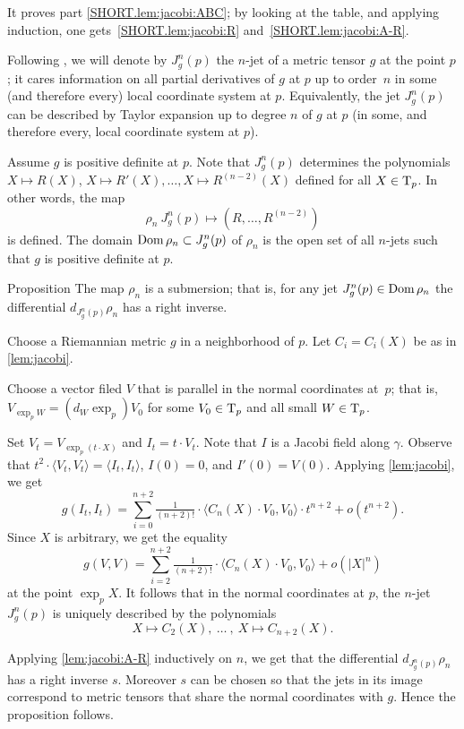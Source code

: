 \documentclass[a4paper,10pt]{article}
\begin{document}
It proves part \ref{SHORT.lem:jacobi:ABC};
by looking at the table, and applying induction, one gets~\ref{SHORT.lem:jacobi:R} and~\ref{SHORT.lem:jacobi:A-R}.\qeds

Following \cite{eliashberg-mishachev}, we will denote by $J^n_g(p)$ the $n$-jet of a metric tensor $g$ at the point $p$;
it cares information on all partial derivatives of $g$ at $p$ up to order~$n$ in some (and therefore every) local coordinate system at $p$.
Equivalently, the jet $J^n_g(p)$ can be described by Taylor expansion up to degree $n$ of $g$ at $p$ (in some, and therefore every, local coordinate system at $p$).

Assume $g$ is positive definite at $p$.
Note that $J^n_g(p)$ determines the polynomials 
$X\mapsto R(X)$, $X\mapsto R'(X),\dots, X\mapsto R^{(n-2)}(X)$ defined for all $X\in \mathrm{T}_p$. 
In other words, the map 
\[\rho_n\:J^n_g(p)\mapsto (R,\dots,R^{(n-2)})\]
is defined.
The domain $\mathop{\rm Dom}\nolimits \rho_n\subset J^n_g(p)$ of $\rho_n$ is the open set of all $n$-jets such that $g$ is positive definite at $p$.

\begin{thm}{Proposition}\label{prop:submersion}
The map $\rho_n$ is a submersion;
that is, for any jet $J^n_g(p)\z\in \Dom \rho_n$ the differential $d_{J^n_g(p)}\rho_n$ has a right inverse.
\end{thm}

Choose a Riemannian metric $g$ in a neighborhood of $p$.
Let $C_i=C_i(X)$ be as in \ref{lem:jacobi}.

Choose a vector filed $V$ that is parallel in the normal coordinates at~$p$;
that is, $V_{\exp_pW}=(d_W\exp_p)V_0$ for some $V_0\in\mathrm{T}_p$ and all small $W\in \mathrm{T}_p$.

Set $V_t=V_{\exp_p(t\cdot X)}$ and $I_t=t\cdot V_t$.
Note that $I$ is a Jacobi field along $\gamma$.
Observe that $t^2\cdot \langle V_t, V_t\rangle=\langle I_t, I_t\rangle$, $I(0)=0$, and $I'(0)=V(0)$.
Applying \ref{lem:jacobi}, we get
\[g(I_t, I_t)=\sum_{i=0}^{n+2}\tfrac1{(n+2)!}\cdot\langle C_n(X)\cdot V_0,V_0\rangle\cdot t^{n+2}+o(t^{n+2}).\]
Since $X$ is arbitrary, we get the equality
\[g( V, V)=\sum_{i=2}^{n+2}\tfrac1{(n+2)!}\cdot\langle C_n(X)\cdot V_0,V_0\rangle+o(|X|^{n})\]
at the point $\exp_p X$.
It follows that in the normal coordinates at $p$,
the $n$-jet $J^n_g(p)$ is uniquely described by the polynomials
\[X\mapsto C_2(X),
\ \dots\ ,\  
X\mapsto C_{n+2}(X).\]

Applying \ref{lem:jacobi:A-R} inductively on $n$, we get that the differential 
$d_{J^n_g(p)}\rho_n$ has a right inverse $s$.
Moreover $s$ can be chosen so that the jets in its image correspond to metric tensors that share the normal coordinates with $g$.
Hence the proposition follows.
\qeds 
\end{document}
